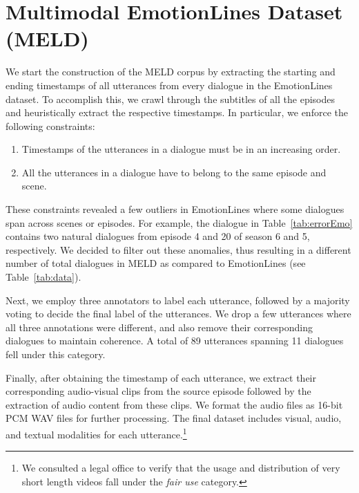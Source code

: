\documentclass[11pt,a4paper]{article}
\begin{document}
\section{Multimodal EmotionLines Dataset (MELD)}
\label{sec:meld}


We start the construction of the MELD corpus by extracting the starting and ending timestamps of all utterances from every dialogue in the EmotionLines dataset. To accomplish this, we crawl through the subtitles of all the episodes and heuristically extract the respective timestamps. In particular, we enforce the following constraints:
	\begin{enumerate}[leftmargin=*]
  \itemsep0em 
		\item Timestamps of the utterances in a dialogue must be in an increasing order.
		\item All the utterances in a dialogue have to belong to the same episode and scene.
	\end{enumerate}

These constraints revealed a few outliers in EmotionLines where some dialogues span across scenes or episodes. For example, the dialogue in Table~\ref{tab:errorEmo} contains two natural dialogues from episode 4 and 20 of season 6 and 5, respectively. We decided to filter out these anomalies, thus resulting in a different number of total dialogues in MELD as compared to EmotionLines (see Table~\ref{tab:data}).
  
Next, we employ three annotators to label each utterance, followed by a majority voting to decide the final label of the utterances. We drop a few utterances where all three annotations were different, and also remove their corresponding dialogues to maintain coherence. A total of 89 utterances spanning 11 dialogues fell under this category.
	
Finally, after obtaining the timestamp of each utterance, we extract their corresponding audio-visual clips from the source episode followed by the extraction of audio content from these clips. We format the audio files as 16-bit PCM WAV files for further processing. The final dataset includes visual, audio, and textual modalities for each utterance.\footnote{We consulted a legal office to verify that the usage and distribution of very short length videos fall under the \textit{fair use} category.}
\end{document}
